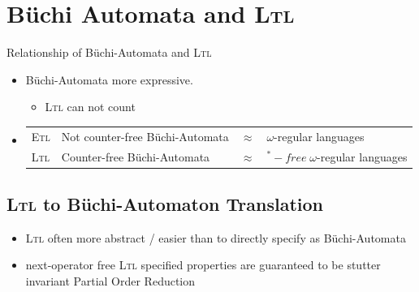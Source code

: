 \documentclass[a4paper, 10pt]{article}
\begin{document}
\section*{Büchi Automata and \textsc{Ltl}}
Relationship of Büchi-Automata and \textsc{Ltl}
\begin{itemize}
    \item Büchi-Automata more expressive.
    \begin{itemize}
        \item \textsc{Ltl} can not count
    \end{itemize}
    \item \begin{tabular}{llcl}
    \textsc{Etl} & Not counter-free Büchi-Automata & $\approx$ & $\omega$-regular languages \\
    \textsc{Ltl} & Counter-free Büchi-Automata & $\approx$ & $^*-free\; \omega$-regular languages
    \end{tabular}
\end{itemize}
\subsection*{\textsc{Ltl} to Büchi-Automaton Translation}
\begin{itemize}
    \item \textsc{Ltl} often more abstract / easier than to directly specify as Büchi-Automata
    \item next-operator free \textsc{Ltl} specified properties are guaranteed to be stutter invariant \follows Partial Order Reduction
\end{itemize}
\end{document}
